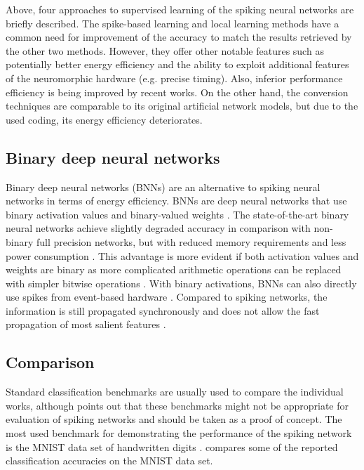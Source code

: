 Above, four approaches to supervised learning of the spiking neural networks are briefly described. The spike-based learning and local learning methods have a common need for improvement of the accuracy to match the results retrieved by the other two methods. However, they offer other notable features such as potentially better energy efficiency and the ability to exploit additional features of the neuromorphic hardware (e.g. precise timing). Also, inferior performance efficiency is being improved by recent works. On the other hand, the conversion techniques are comparable to its original artificial network models, but due to the used coding, its energy efficiency deteriorates.

\subsection{Binary deep neural networks}
Binary deep neural networks (BNNs) are an alternative to spiking neural networks in terms of energy efficiency. BNNs are deep neural networks that use binary activation values and binary-valued weights \cite{simonsReviewBinarized19}. The state-of-the-art binary neural networks achieve slightly degraded accuracy in comparison with non-binary full precision networks, but with reduced memory requirements and less power consumption \cite{courbariauxBinarizedNeural16}. This advantage is more evident if both activation values and weights are binary as more complicated arithmetic operations can be replaced with simpler bitwise operations \cite{kimBitwiseNeural16}. With binary activations, BNNs can also directly use spikes from event-based hardware \cite{linAccurateBinary17}. Compared to spiking networks, the information is still propagated synchronously and does not allow the fast propagation of most salient features \cite{pfeifferDeepLearningSpiking2018}.

\subsection{Comparison}
Standard classification benchmarks are usually used to compare the individual works, although \cite{pfeifferDeepLearningSpiking2018} points out that these benchmarks might not be appropriate for evaluation of spiking networks and should be taken as a proof of concept. The most used benchmark for demonstrating the performance of the spiking network is the MNIST data set of handwritten digits \cite{lecunGradientbasedLearning98}.  compares some of the reported classification accuracies on the MNIST data set.


